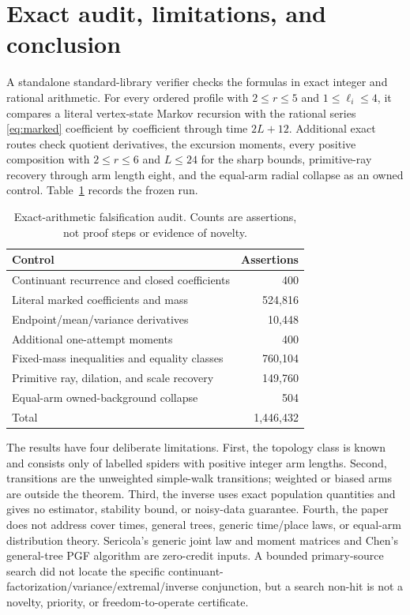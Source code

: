 \documentclass[a4paper,10pt]{amsart}
\theoremstyle{remark}
\begin{document}
\section{Exact audit, limitations, and conclusion}\label{sec:audit}

A standalone standard-library verifier checks the formulas in exact integer
and rational arithmetic.  For every ordered profile with $2\le r\le5$ and
$1\le\ell_i\le4$, it compares a literal vertex-state Markov recursion with
the rational series \eqref{eq:marked} coefficient by coefficient through time
$2L+12$.  Additional exact routes check quotient derivatives, the excursion
moments, every positive composition with $2\le r\le6$ and $L\le24$ for the
sharp bounds, primitive-ray recovery through arm length eight, and the
equal-arm radial collapse as an owned control.  Table~\ref{tab:audit} records
the frozen run.

\begin{table}[ht]
\centering
\small
\caption{Exact-arithmetic falsification audit.  Counts are assertions, not
proof steps or evidence of novelty.}
\label{tab:audit}
\begin{tabular}{@{}lr@{}}
\toprule
Control & Assertions \\
\midrule
Continuant recurrence and closed coefficients & 400 \\
Literal marked coefficients and mass & 524,816 \\
Endpoint/mean/variance derivatives & 10,448 \\
Additional one-attempt moments & 400 \\
Fixed-mass inequalities and equality classes & 760,104 \\
Primitive ray, dilation, and scale recovery & 149,760 \\
Equal-arm owned-background collapse & 504 \\
\midrule
Total & 1,446,432 \\
\bottomrule
\end{tabular}
\end{table}

The results have four deliberate limitations.  First, the topology class is
known and consists only of labelled spiders with positive integer arm lengths.
Second, transitions are the unweighted simple-walk transitions; weighted or
biased arms are outside the theorem.  Third, the inverse uses exact population
quantities and gives no estimator, stability bound, or noisy-data guarantee.
Fourth, the paper does not address cover times, general trees, generic
time/place laws, or equal-arm distribution theory.  Sericola's generic joint
law and moment matrices and Chen's general-tree PGF algorithm are zero-credit
inputs.  A bounded primary-source search did not locate the specific
continuant-factorization/variance/extremal/inverse conjunction, but a search
non-hit is not a novelty,
priority, or freedom-to-operate certificate.
\end{document}
